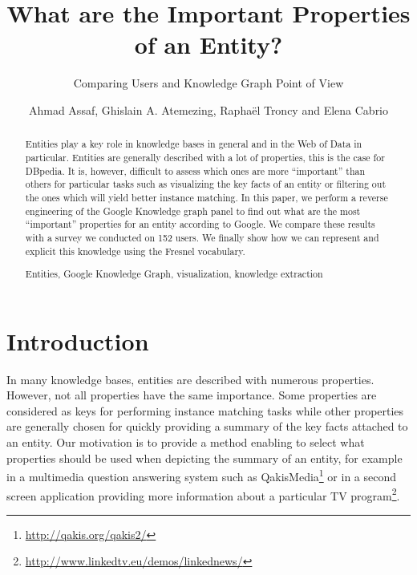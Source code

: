 \documentclass[runningheads,a4paper]{llncs}
\newcommand{\keywords}[1]{\par\addvspace\baselineskip
\noindent\keywordname\enspace\ignorespaces#1}
\begin{document}
\title{What are the Important Properties of an Entity?}
\subtitle{Comparing Users and Knowledge Graph Point of View}

\author{Ahmad Assaf, Ghislain A. Atemezing, Rapha\"{e}l Troncy and Elena Cabrio }



\maketitle


\begin{abstract}
Entities play a key role in knowledge bases in general and in the Web of Data in particular. Entities are generally described with a lot of properties, this is the case for DBpedia. It is, however, difficult to assess which ones are more ``important'' than others for particular tasks such as visualizing the key facts of an entity or filtering out the ones which will yield better instance matching. In this paper, we perform a reverse engineering of the Google Knowledge graph panel to find out what are the most ``important'' properties for an entity according to Google. We compare these results with a survey we conducted on 152 users. We finally show how we can represent and explicit this knowledge using the Fresnel vocabulary.
\keywords{Entities, Google Knowledge Graph, visualization, knowledge extraction}
\end{abstract}


\section{Introduction}
\label{sec:introduction}
In many knowledge bases, entities are described with numerous properties. However, not all properties have the same importance. Some properties are considered as keys for performing instance matching tasks while other properties are generally chosen for quickly providing a summary of the key facts attached to an entity. Our motivation is to provide a method enabling to select what properties should be used when depicting the summary of an entity, for example in a multimedia question answering system such as QakisMedia\footnote{\url{http://qakis.org/qakis2/}} or in a second screen application providing more information about a particular TV program\footnote{\url{http://www.linkedtv.eu/demos/linkednews/}}.
\end{document}
